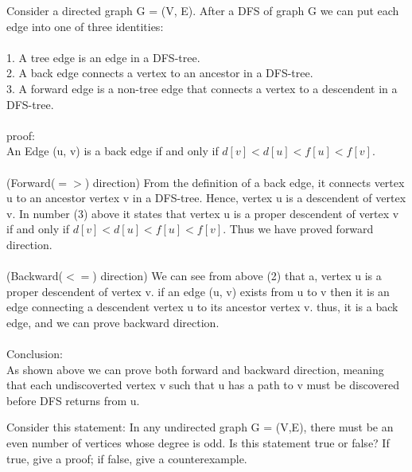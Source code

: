 \documentclass[10pt]{article}
\newenvironment{exercise}[2][Exercise]{\begin{trivlist}
\item[\hskip \labelsep {\bfseries #1}\hskip \labelsep {\bfseries #2.}]}{\end{trivlist}}
\newenvironment{solution}[2][Solution]{\begin{trivlist}
\item[\hskip \labelsep {\bfseries #1}\hskip \labelsep {\bfseries #2.}]}{\end{trivlist}}
\theoremstyle{definition}
\begin{document}
\begin{solution}{(2)}
Consider a directed graph G = (V, E). After a DFS of graph G we can put each edge into one of three identities:\\
\\
1. A tree edge is an edge in a DFS-tree.\\
2. A back edge connects a vertex to an ancestor in a DFS-tree. \\
3. A forward edge is a non-tree edge that connects a vertex to a descendent in a DFS-tree.\\
\\
proof:\\
An Edge (u, v) is a back edge if and only if $d[v] < d[u] < f[u] < f[v]$. \\
\\
(Forward($=>$) direction) From the definition of a back edge, it connects vertex u to an ancestor vertex v in a DFS-tree. Hence, vertex u is a descendent of vertex v. In number (3) above it states that vertex u is a proper descendent of vertex v if and only if $d[v] < d[u] < f[u] < f[v]$. Thus we have proved forward direction.\\
\\
(Backward($<=$) direction) We can see from above (2) that a, vertex u is a proper descendent of vertex v.  if an edge (u, v) exists from u to v then it is an edge connecting a descendent vertex u to its ancestor vertex v. thus, it is a back edge, and we can prove backward direction.\\
\\
Conclusion:\\
As shown above we can prove both forward and backward direction, meaning that each undiscoverted vertex v such that u has a path to v must be discovered before DFS returns from u.\\
\end{solution}


\begin{exercise}{(3)}
Consider this statement: In any undirected graph G = (V,E), there must be an even number
of vertices whose degree is odd. Is this statement true or false? If true, give a proof; if false,
give a counterexample.
\\
\end{exercise}
\end{document}

